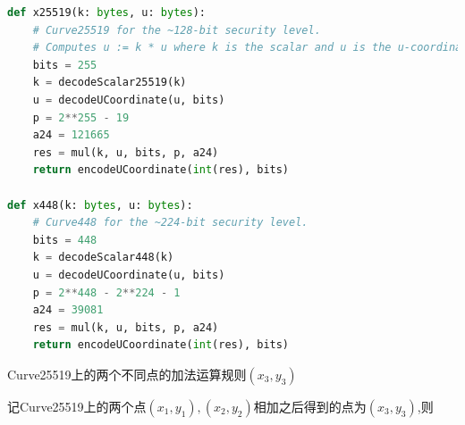 \begin{lstlisting}[language=python, caption = X25519与X448的Python示例, label=lst-x25519x448]
def x25519(k: bytes, u: bytes):
    # Curve25519 for the ~128-bit security level.
    # Computes u := k * u where k is the scalar and u is the u-coordinate.
    bits = 255
    k = decodeScalar25519(k)
    u = decodeUCoordinate(u, bits)
    p = 2**255 - 19
    a24 = 121665
    res = mul(k, u, bits, p, a24)
    return encodeUCoordinate(int(res), bits)

def x448(k: bytes, u: bytes):
    # Curve448 for the ~224-bit security level.
    bits = 448
    k = decodeScalar448(k)
    u = decodeUCoordinate(u, bits)
    p = 2**448 - 2**224 - 1
    a24 = 39081
    res = mul(k, u, bits, p, a24)
    return encodeUCoordinate(int(res), bits)
\end{lstlisting}


Curve25519上的两个不同点的加法运算规则$(x_3, y_3)$

记Curve25519上的两个点$(x_1,y_1), (x_2, y_2)$相加之后得到的点为$(x_3,y_3)$,则